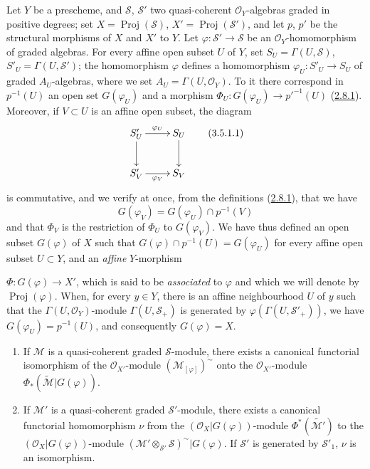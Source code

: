 \begin{env}[3.5.1]
\label{II.3.5.1}
Let $Y$ be a prescheme, and $\mathcal{S}$, $\mathcal{S}'$ two quasi-coherent
$\mathcal{O}_Y$-algebras graded in positive degrees; set
$X=\operatorname{Proj}(\mathcal{S})$, $X'=\operatorname{Proj}(\mathcal{S}')$,
and let $p$, $p'$ be the structural morphisms of $X$ and $X'$ to $Y$. Let
$\varphi:\mathcal{S}'\to\mathcal{S}$ be an $\mathcal{O}_Y$-homomorphism
of graded algebras. For every affine open subset $U$ of $Y$, set
$S_U=\Gamma(U,\mathcal{S})$, $S'_U=\Gamma(U,\mathcal{S}')$;
the homomorphism $\varphi$ defines a homomorphism
$\varphi_U:S'_U\to S_U$ of graded $A_U$-algebras, where we set
$A_U=\Gamma(U,\mathcal{O}_Y)$. To it there correspond in $p^{-1}(U)$ an open
set $G(\varphi_U)$ and a morphism
$\Phi_U:G(\varphi_U)\to p'^{-1}(U)$
(\hyperref[II.2.8.1]{2.8.1}). Moreover, if $V\subset U$ is an affine open
subset, the diagram
\[
\label{II.3.5.1.1}
  \xymatrix{
    S'_U\ar[r]^{\varphi_U}\ar[d]
    & S_U\ar[d]\\
    S'_V\ar[r]_{\varphi_V}
    & S_V
  }
\tag{3.5.1.1}
\]
is commutative, and we verify at once, from the definitions
(\hyperref[II.2.8.1]{2.8.1}), that we have
\[
  G(\varphi_V)=G(\varphi_U)\cap p^{-1}(V)
\]
and that $\Phi_V$ is the restriction of $\Phi_U$ to $G(\varphi_V)$. We have
thus defined an open subset $G(\varphi)$ of $X$ such that
$G(\varphi)\cap p^{-1}(U)=G(\varphi_U)$ for every affine open subset $U\subset Y$,
and an \emph{affine} $Y$-morphism


$\Phi:G(\varphi)\to X'$, which is said to be \emph{associated} to $\varphi$ and
which we will denote by $\operatorname{Proj}(\varphi)$. When, for every
$y\in Y$, there is an affine neighbourhood $U$ of $y$ such that the
$\Gamma(U,\mathcal{O}_Y)$-module $\Gamma(U,\mathcal{S}_+)$ is generated by
$\varphi(\Gamma(U,\mathcal{S}'_+))$, we have
$G(\varphi_U)=p^{-1}(U)$, and consequently $G(\varphi)=X$.
\end{env}

\begin{proposition}[3.5.2]
\label{II.3.5.2}
\begin{enumerate}
  \item[\rm(i)] If $\mathcal{M}$ is a quasi-coherent graded
    $\mathcal{S}$-module, there exists a canonical functorial isomorphism
    of the $\mathcal{O}_{X'}$-module $(\mathcal{M}_{[\varphi]})^{\sim}$ onto
    the $\mathcal{O}_{X'}$-module
    $\Phi_*(\widetilde{\mathcal{M}}|G(\varphi))$.
  \item[\rm(ii)] If $\mathcal{M}'$ is a quasi-coherent graded
    $\mathcal{S}'$-module, there exists a canonical functorial homomorphism
    $\nu$ from the $(\mathcal{O}_X|G(\varphi))$-module
    $\Phi^*(\widetilde{\mathcal{M}'})$ to the
    $(\mathcal{O}_X|G(\varphi))$-module
    $(\mathcal{M}'\otimes_{\mathcal{S}'}\mathcal{S})^{\sim}|G(\varphi)$. If
    $\mathcal{S}'$ is generated by $\mathcal{S}'_1$, $\nu$ is an
    isomorphism.
\end{enumerate}
\end{proposition}

